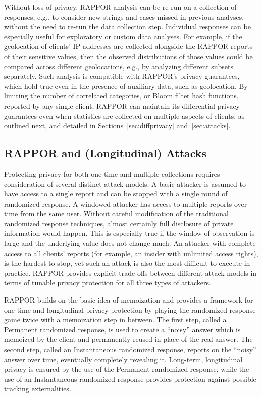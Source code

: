 \documentclass{sig-alternate-2013}
\newcommand\RAPPOR{{RAPPOR}}
\begin{document}
Without loss of privacy,
\RAPPOR{} analysis can be re-run on a collection of responses, e.g., 
to consider new strings and cases missed in previous analyses,
without the need to re-run the data collection step.
Individual responses
can be especially useful for exploratory or custom data analyses. 
For example, if the geolocation of clients' IP addresses are collected
alongside the \RAPPOR{} reports of their sensitive values, 
then the observed distributions
of those values 
could be compared across different geolocations,
e.g., by analyzing different subsets separately.
Such analysis
is compatible with \RAPPOR{}'s privacy guarantees,
which hold true even in the presence of auxiliary data,
such as geolocation.
By limiting the number of correlated categories, or Bloom filter hash functions,
reported by any single client,
\RAPPOR{} can maintain its differential-privacy guarantees even when 
statistics are collected on multiple aspects of clients,
as outlined next, and detailed in Sections~\ref{sec:diffprivacy} and~\ref{sec:attacks}.











\subsection{\RAPPOR{} and (Longitudinal) Attacks}
Protecting privacy for both one-time and multiple collections requires consideration of several distinct attack models.
 A basic attacker is assumed to have access to a single report and can be stopped with a single round of randomized response.
A windowed attacker has access to multiple reports over time from the same user.
Without careful modification of the traditional randomized response techniques, almost certainly full disclosure of private information would happen.
This is especially true if the window of observation is large and the underlying value does not change much.
An attacker with complete access to all clients' reports (for example, an insider with unlimited access rights),
is the hardest to stop, yet such an attack is also the most difficult to execute in practice. \RAPPOR{} provides explicit trade-offs between
different attack models in terms of tunable privacy protection for all three types of attackers.

\RAPPOR{} builds on the basic idea of memoization and provides a framework for one-time and longitudinal privacy protection by playing the randomized response game twice with a memoization step in between. The first step, called a Permanent randomized response, is used to create a ``noisy'' answer which is memoized by the client and permanently reused in place of the real answer. The second step, called an Instantaneous randomized response, reports on the ``noisy'' answer over time, eventually completely revealing it. 
Long-term, longitudinal privacy is ensured by the use of the Permanent randomized response, while the use of an Instantaneous randomized response provides protection against possible tracking externalities.
\end{document}
